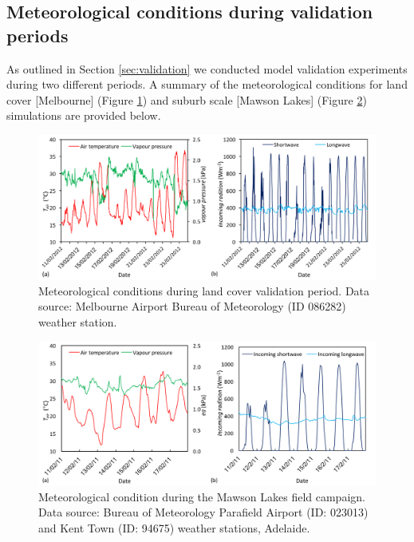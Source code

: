 \documentclass[journal abbreviation, manuscript]{copernicus}
\begin{document}
\subsection{Meteorological conditions during validation periods}

As outlined in Section \ref{sec:validation} we conducted model validation experiments during two different periods. A summary of the meteorological conditions for  land cover [Melbourne] (Figure \ref{fig:met}) and suburb scale [Mawson Lakes] (Figure \ref{fig:met3}) simulations are provided below.

\begin{figure}[!htbp]

\includegraphics[width=1\textwidth,keepaspectratio]{figure11.png}

 \caption{Meteorological conditions during land cover validation period. Data source: Melbourne Airport Bureau of Meteorology (ID 086282) weather station.} \label{fig:met}
\end{figure}

\begin{figure}[!htbp]

\includegraphics[width=1\textwidth,keepaspectratio]{figure12.png}

 \caption{Meteorological condition during the Mawson Lakes field campaign. Data source: Bureau of Meteorology Parafield Airport (ID: 023013) and Kent Town (ID: 94675) weather stations, Adelaide.} \label{fig:met3}
\end{figure}
\end{document}
